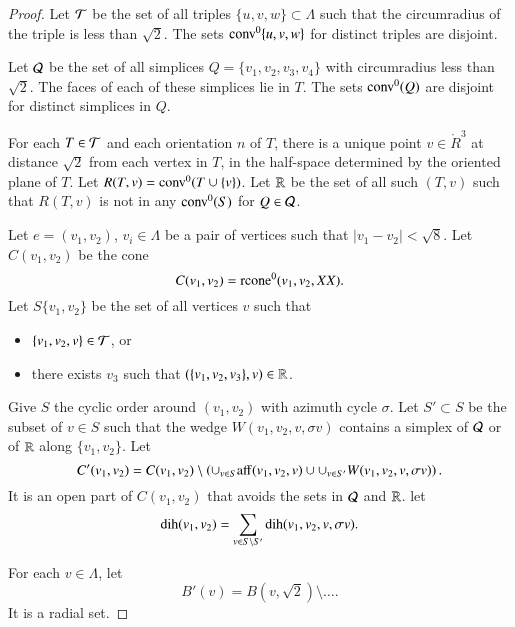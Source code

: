 \begin{proof} Let ${\mathcal T}$ be the set of all triples
$\{u,v,w\}\subset\Lambda$ such that the circumradius of the triple is less than $\sqrt2$.
The sets ${\operatorname{conv}}^0\{u,v,w\}$ for distinct triples are disjoint.

Let ${\mathcal Q}$ be the set of all simplices $Q=\{v_1,v_2,v_3,v_4\}$ with circumradius less than $\sqrt2$.
The faces of each of these simplices lie in $T$.  The sets ${\operatorname{conv}}^0(Q)$ are disjoint
for distinct simplices in $Q$.

For each $T\in {\mathcal T}$ and each orientation $n$  of $T$, there is a unique point $v\in\ring{R}^3$
at distance $\sqrt2$ from each vertex in $T$, in the half-space determined by the oriented plane
of $T$.  Let $R(T,v) = {\operatorname{conv}}^0(T\cup\{v\})$.  Let ${\mathbb R}$ be the set of all such
$(T,v)$ such that $R(T,v)$ is not in any ${\operatorname{conv}}^0(S)$ for $Q\in{\mathcal Q}$.

Let $e=(v_1,v_2)$, $v_i\in\Lambda$ be a pair of vertices such that $|v_1-v_2|<\sqrt8$.  
Let $C(v_1,v_2)$ be the cone
$$
C(v_1,v_2) = {\operatorname{rcone}}^0(v_1,v_2,XX).
$$
Let $S\{v_1,v_2\}$ be
the set of all vertices $v$ such that
\begin{itemize}
\item $\{v_1,v_2,v\}\in {\mathcal T}$, or
\item there exists $v_3$ such that $(\{v_1,v_2,v_3\},v)\in{\mathbb R}$.
\end{itemize}
Give $S$ the cyclic order around $(v_1,v_2)$ with azimuth cycle $\sigma$.
Let $S'\subset S$ be the subset of $v\in S$ such that the wedge
$W(v_1,v_2,v,\sigma v)$ contains a simplex of ${\mathcal Q}$ or of ${\mathbb R}$ along $\{v_1,v_2\}$.
Let 
$$
C'(v_1,v_2) = C(v_1,v_2)\setminus\left(\cup_{v\in S}{\operatorname{aff}}(v_1,v_2,v)\cup\cup_{v\in S'} W(v_1,v_2,v,\sigma v)\right).
$$
It is an open part of $C(v_1,v_2)$ that avoids the sets in ${\mathcal Q}$ and ${\mathbb R}$.
let 
$$\operatorname{dih}(v_1,v_2) = \sum_{v\in S\setminus S'} \operatorname{dih}(v_1,v_2,v,\sigma v).
$$

For each $v\in\Lambda$, let 
$$B'(v) = B(v,\sqrt2) \setminus \ldots.$$
It is a radial set.



\end{proof}
